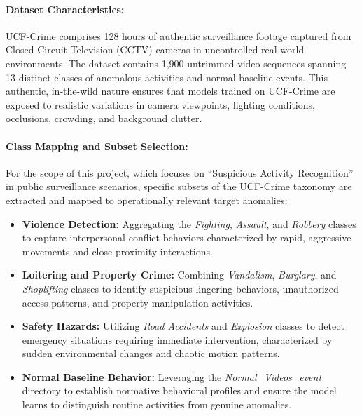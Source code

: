 \documentclass[12pt]{article}
\begin{document}
\paragraph{Dataset Characteristics:}
 UCF-Crime comprises 128 hours of authentic surveillance footage captured from Closed-Circuit Television (CCTV) cameras in uncontrolled real-world environments. The dataset contains 1,900 untrimmed video sequences spanning 13 distinct classes of anomalous activities and normal baseline events. This authentic, in-the-wild nature ensures that models trained on UCF-Crime are exposed to realistic variations in camera viewpoints, lighting conditions, occlusions, crowding, and background clutter.

\paragraph{Class Mapping and Subset Selection:}
For the scope of this project, which focuses on ``Suspicious Activity Recognition'' in public surveillance scenarios, specific subsets of the UCF-Crime taxonomy are extracted and mapped to operationally relevant target anomalies:

\begin{itemize}
    \item \textbf{Violence Detection:} Aggregating the \textit{Fighting}, \textit{Assault}, and \textit{Robbery} classes to capture interpersonal conflict behaviors characterized by rapid, aggressive movements and close-proximity interactions.
    
    \item \textbf{Loitering and Property Crime:} Combining \textit{Vandalism}, \textit{Burglary}, and \textit{Shoplifting} classes to identify suspicious lingering behaviors, unauthorized access patterns, and property manipulation activities.
    
    \item \textbf{Safety Hazards:} Utilizing \textit{Road Accidents} and \textit{Explosion} classes to detect emergency situations requiring immediate intervention, characterized by sudden environmental changes and chaotic motion patterns.
    
    \item \textbf{Normal Baseline Behavior:} Leveraging the \textit{Normal\_Videos\_event} directory to establish normative behavioral profiles and ensure the model learns to distinguish routine activities from genuine anomalies.
\end{itemize}
\end{document}

